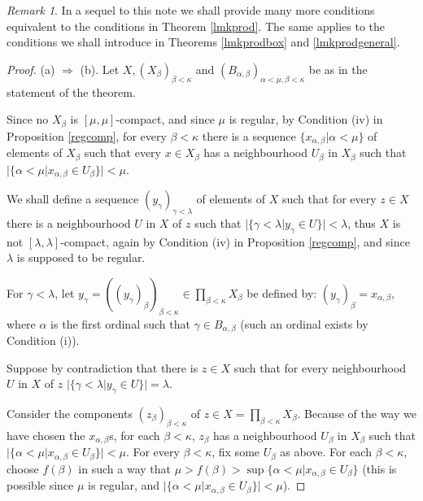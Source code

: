 \documentclass[12pt]{amsart}
\theoremstyle{definition}
\theoremstyle{remark}
\newtheorem{remark}[theorem]{Remark}
\begin{document}
\begin{remark}\label{future}
In a sequel to this note we shall provide many more 
conditions equivalent to the 
conditions in Theorem \ref{lmkprod}.
The same applies to the conditions we shall introduce
in Theorems \ref{lmkprodbox} and \ref{lmkprodgeneral}.
\end{remark}

\begin{proof}
(a) $\Rightarrow$ (b).
Let $X, (X_ \beta) _{ \beta < \kappa }  $ and
$ (B_{ \alpha , \beta }) _{ \alpha<\mu , \beta<\kappa}  $ 
 be as in the statement
of the theorem.

Since 
no $X_\beta$ is 
$[ \mu, \mu]$-compact, 
and since $ \mu $ is regular, 
by Condition (iv) in Proposition \ref{regcomp}, 
for every $\beta<\kappa$ there is a 
 sequence $\{x_{\alpha , \beta}| \alpha <\mu \} $ 
of elements of $X_ \beta $ 
such that 
every $x \in X_\beta$ has a neighbourhood $U_ \beta$  
in $X_\beta$  such that 
$ |\{ \alpha<\mu | x_{\alpha , \beta} \in U_ \beta  \}|<  \mu  $.

We shall define a sequence 
$(y_\gamma) _{\gamma<\lambda}$ of elements of $ X$ such that 
for every $z \in X$ there is a neighbourhood $U$ in $X$ of $z$
 such that 
$ |\{\gamma<\lambda| y_\gamma \in U\}|<  \lambda$, thus 
 $X$ is not  $[ \lambda, \lambda]$-compact,
again by Condition (iv) in Proposition \ref{regcomp},
and since  $ \lambda $ is supposed to be  regular.

For $\gamma<\lambda$, 
let $y_\gamma =((y_\gamma )_\beta)_{\beta<\kappa} \in \prod_{\beta<\kappa} X_\beta $
be defined by: $(y_\gamma )_\beta =x_{\alpha, \beta}$, where $\alpha $ is the first ordinal
such that $\gamma \in B_{ \alpha , \beta } $ (such an ordinal exists by Condition (i)).

Suppose by contradiction that there is $z \in X$ 
 such that for every neighbourhood $U$ in $X$ of $z$
 $ |\{\gamma<\lambda| y_\gamma \in U\}|=  \lambda$.

Consider the components $(z_\beta)_{\beta<\kappa}$
of $z\in X=\prod_{\beta<\kappa} X_\beta$.
Because of the way we have chosen the 
$ x_{\alpha , \beta}$s,
for each $\beta<\kappa$, $z_\beta$ has a neighbourhood
$U_\beta$ in $X_\beta$ such that 
$ |\{\alpha < \mu| x_{\alpha , \beta}\in U_\beta\}| < \mu  $.
 For every $\beta<\kappa$, fix some $U_\beta$ as above. 
For each $\beta<\kappa$, choose $f(\beta)$ in such a way that
$\mu >f(\beta)>\sup \{\alpha < \mu | x_{\alpha , \beta}\in U_\beta\}$
 (this is possible since $\mu $ is regular, and
$ |\{\alpha < \mu | x_{\alpha , \beta}\in U_\beta\}| < \mu  $).


\end{proof}
\end{document}
